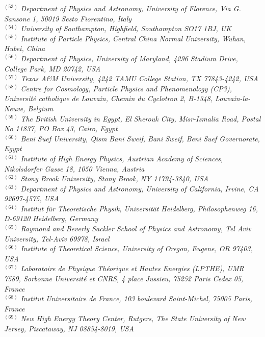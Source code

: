 {\begin{center}
$^{(53)}$ \emph{Department of Physics and Astronomy, University of Florence, Via G. Sansone 1, 50019 Sesto Fiorentino, Italy}\\
$^{(54)}$ \emph{University of Southampton, Highfield, Southampton SO17 1BJ, UK}\\
$^{(55)}$ \emph{Institute of Particle Physics, Central China Normal University, Wuhan, Hubei, China}\\
$^{(56)}$ \emph{Department of Physics, University of Maryland, 4296 Stadium Drive, College Park, MD  20742,  USA}\\
$^{(57)}$ \emph{Texas A\&M University, 4242 TAMU College Station, TX 77843-4242, USA}\\
$^{(58)}$ \emph{Centre for Cosmology, Particle Physics and Phenomenology (CP3), Universit\'e catholique de Louvain, Chemin du Cyclotron 2, B-1348, Louvain-la-Neuve, Belgium}\\
$^{(59)}$ \emph{The British University in Egypt, El Sherouk City, Misr-Ismalia Road, Postal No 11837, PO Box 43, Cairo, Egypt}\\
$^{(60)}$ \emph{Beni Suef University, Qism Bani Sweif, Bani Sweif, Beni Suef Governorate, Egypt}\\
$^{(61)}$ \emph{Institute of High Energy Physics, Austrian Academy of Sciences, Nikolsdorfer Gasse 18, 1050 Vienna, Austria}\\
$^{(62)}$ \emph{Stony Brook University, Stony Brook, NY 11794-3840, USA}\\
$^{(63)}$ \emph{Department of Physics and Astronomy, University of California, Irvine, CA 92697-4575, USA}\\
$^{(64)}$ \emph{Institut  f\"ur Theoretische Physik, Universit\"at Heidelberg, Philosophenweg 16, D-69120 Heidelberg, Germany}\\
$^{(65)}$ \emph{Raymond and Beverly Sackler School of Physics and Astronomy, Tel Aviv University, Tel-Aviv 69978, Israel}\\
$^{(66)}$ \emph{Institute of Theoretical Science, University of Oregon, Eugene, OR 97403, USA}\\
$^{(67)}$ \emph{Laboratoire de Physique Th\'eorique et Hautes Energies (LPTHE), UMR 7589, Sorbonne Universit\'e et CNRS, 4 place Jussieu, 75252 Paris Cedex 05, France}\\
$^{(68)}$ \emph{Institut Universitaire de France, 103 boulevard Saint-Michel, 75005 Paris, France}\\
$^{(69)}$ \emph{New High Energy Theory Center, Rutgers, The State University of New Jersey, Piscataway, NJ 08854-8019, USA}\\

\end{center}}
